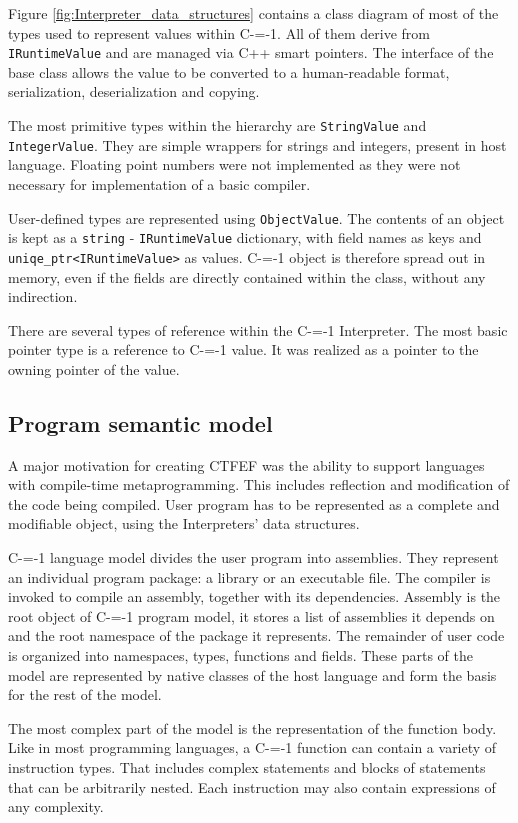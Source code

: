 Figure \ref{fig:Interpreter_data_structures} contains a class diagram of most of the types used to represent values within C-=-1.
All of them derive from \lstinline{IRuntimeValue} and are managed via C++ smart pointers.
The interface of the base class allows the value to be converted to a human-readable format, serialization, deserialization and copying.

The most primitive types within the hierarchy are \lstinline{StringValue} and \lstinline{IntegerValue}.
They are simple wrappers for strings and integers, present in host language.
Floating point numbers were not implemented as they were not necessary for implementation of a basic compiler.

User-defined types are represented using \lstinline{ObjectValue}.
The contents of an object is kept as a \lstinline{string} - \lstinline{IRuntimeValue} dictionary, with field names as keys and \lstinline{uniqe_ptr<IRuntimeValue>} as values.
C-=-1 object is therefore spread out in memory, even if the fields are directly contained within the class, without any indirection.


There are several types of reference within the C-=-1 Interpreter.
The most basic pointer type is a reference to C-=-1 value.
It was realized as a pointer to the owning pointer of the value.

\subsection{Program semantic model}
\label{semantic_model}

A major motivation for creating CTFEF was the ability to support languages with compile-time metaprogramming.
This includes reflection and modification of the code being compiled.
User program has to be represented as a complete and modifiable object, using the Interpreters' data structures.

C-=-1 language model divides the user program into assemblies.
They represent an individual program package: a library or an executable file.
The compiler is invoked to compile an assembly, together with its dependencies.
Assembly is the root object of C-=-1 program model, it stores a list of assemblies it depends on and the root namespace of the package it represents.
The remainder of user code is organized into namespaces, types, functions and fields.
These parts of the model are represented by native classes of the host language and form the basis for the rest of the model.

The most complex part of the model is the representation of the function body.
Like in most programming languages, a C-=-1 function can contain a variety of instruction types.
That includes complex statements and blocks of statements that can be arbitrarily nested.
Each instruction may also contain expressions of any complexity.

